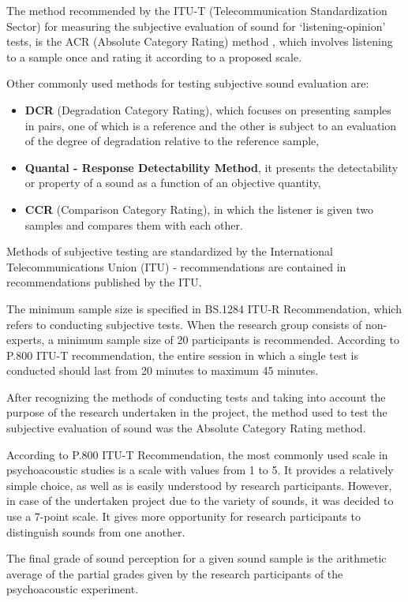 \documentclass[a4paper,10pt]{article}
\begin{document}
\begin{multicols}{2}
  The method recommended by the ITU-T (Telecommunication Standardization Sector)
  for measuring the subjective evaluation of sound for ‘listening-opinion’
  tests, is the ACR (Absolute Category Rating) method \cite{ITU-T:P800-2}, which involves
  listening to a sample once and rating it according to a proposed scale.

  Other commonly used methods for testing subjective sound evaluation are:

  \begin{itemize}
    \item \textbf{DCR} (Degradation Category Rating), which focuses on
      presenting samples in pairs, one of which is a reference and the other is
      subject to an evaluation of the degree of degradation relative to the
      reference sample,
    \item \textbf{Quantal - Response Detectability Method}, it presents the
      detectability or property of a sound as a function of an objective
      quantity,
    \item \textbf{CCR} (Comparison Category Rating), in which the listener is
      given two samples and compares them with each other.
  \end{itemize}

  Methods of subjective testing are standardized by the International
  Telecommunications Union (ITU) - recommendations are contained in
  recommendations published by the ITU.

  The minimum sample size is specified in BS.1284 ITU-R Recommendation, which
  refers to conducting subjective tests. When the research group consists of
  non-experts, a minimum sample size of 20 participants is recommended.
  According to  P.800 ITU-T recommendation, the entire session in which a single
  test is conducted should last from 20 minutes to maximum 45 minutes.

  After recognizing the methods of conducting tests and taking into account the
  purpose of the research undertaken in the project, the method used to test the
  subjective evaluation of sound was the Absolute Category Rating method.

  According to P.800 ITU-T Recommendation, the most commonly used scale in
  psychoacoustic studies is a scale with values from 1 to 5. It provides a
  relatively simple choice, as well as is easily understood by research
  participants. However, in case of the undertaken project due to the variety of
  sounds, it was decided to use a 7-point scale. It gives more opportunity for
  research participants to distinguish sounds from one another.

  The final grade of sound perception for a given sound sample is the arithmetic
  average of the partial grades given by the research participants of the
  psychoacoustic experiment.
\end{multicols}
\end{document}
